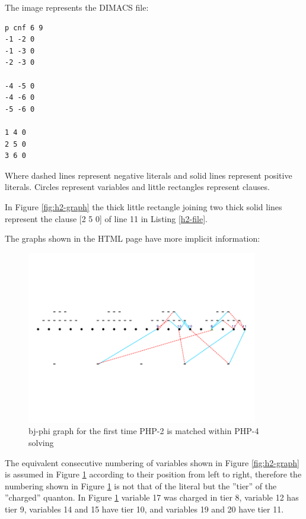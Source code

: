\documentclass{easychair}
\newcommand{\quanton}{\textsf{quanton}}
\begin{document}
The image represents the DIMACS file:

\begin{lstlisting}[label=h2-file, caption=PHP of size 2 DIMACS file,]
p cnf 6 9
-1 -2 0
-1 -3 0
-2 -3 0

-4 -5 0
-4 -6 0
-5 -6 0

1 4 0
2 5 0
3 6 0
\end{lstlisting}

Where dashed lines represent negative literals and solid lines represent positive literals. Circles represent variables and little rectangles represent clauses.

In Figure \ref{fig:h2-graph} the thick little rectangle joining two thick solid lines  represent the clause [2 5 0] of line 11 in Listing \ref{h2-file}.

The graphs shown in the HTML page have more implicit information:

\begin{figure}[H]
	\begin{centering}
		\includegraphics[width=0.9\textwidth]{h4_find1.png}
	\end{centering}
	\caption{bj-phi graph for the first time PHP-2 is matched within PHP-4 solving}
	\label{fig:h4-f1}
\end{figure}

The equivalent consecutive numbering of variables shown in Figure \ref{fig:h2-graph} is assumed in Figure \ref{fig:h4-f1} according to their position from left to right, therefore the numbering shown in Figure \ref{fig:h4-f1} is not that of the literal but the ''tier'' of the ''charged'' {\quanton}. In Figure \ref{fig:h4-f1} variable 17 was charged in tier 8, variable 12 has tier 9, variables 14 and 15 have tier 10, and variables 19 and 20 have tier 11.
\end{document}
